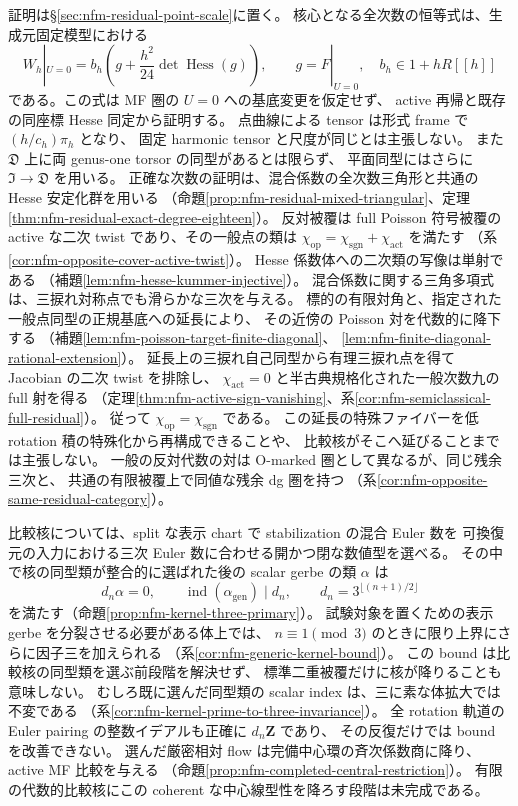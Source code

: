 証明は\S\ref{sec:nfm-residual-point-scale}に置く。
核心となる全次数の恒等式は、生成元固定模型における
\[
 W_h|_{U=0}=b_h\left(g+\frac{h^2}{24}\det\operatorname{Hess}(g)\right),
 \qquad g=F|_{U=0},\quad b_h\in1+hR[[h]]
\]
である。この式は MF 圏の $U=0$ への基底変更を仮定せず、
active 再帰と既存の同座標 Hesse 同定から証明する。
点曲線による tensor は形式 frame で $(h/c_h)\pi_h$ となり、
固定 harmonic tensor と尺度が同じとは主張しない。
また $\mathfrak D$ 上に両 genus-one torsor の同型があるとは限らず、
平面同型にはさらに $\mathfrak I\to\mathfrak D$ を用いる。
正確な次数の証明は、混合係数の全次数三角形と共通の Hesse 安定化群を用いる
（命題\ref{prop:nfm-residual-mixed-triangular}、定理\ref{thm:nfm-residual-exact-degree-eighteen}）。
反対被覆は full Poisson 符号被覆の active な二次 twist であり、その一般点の類は
$\chi_{\mathrm{op}}=\chi_{\mathrm{sgn}}+\chi_{\mathrm{act}}$ を満たす
（系\ref{cor:nfm-opposite-cover-active-twist}）。
Hesse 係数体への二次類の写像は単射である
（補題\ref{lem:nfm-hesse-kummer-injective}）。
混合係数に関する三角多項式は、三捩れ対称点でも滑らかな三次を与える。
標的の有限対角と、指定された一般点同型の正規基底への延長により、
その近傍の Poisson 対を代数的に降下する
（補題\ref{lem:nfm-poisson-target-finite-diagonal}、
\ref{lem:nfm-finite-diagonal-rational-extension}）。
延長上の三捩れ自己同型から有理三捩れ点を得て Jacobian の二次 twist を排除し、
$\chi_{\mathrm{act}}=0$ と半古典規格化された一般次数九の full 射を得る
（定理\ref{thm:nfm-active-sign-vanishing}、系\ref{cor:nfm-semiclassical-full-residual}）。
従って $\chi_{\mathrm{op}}=\chi_{\mathrm{sgn}}$ である。
この延長の特殊ファイバーを低 rotation 積の特殊化から再構成できることや、
比較核がそこへ延びることまでは主張しない。
一般の反対代数の対は O-marked 圏として異なるが、同じ残余三次と、
共通の有限被覆上で同値な残余 dg 圏を持つ
（系\ref{cor:nfm-opposite-same-residual-category}）。

比較核については、split な表示 chart で stabilization の混合 Euler 数を
可換復元の入力における三次 Euler 数に合わせる開かつ閉な数値型を選べる。
その中で核の同型類が整合的に選ばれた後の scalar gerbe の類 $\alpha$ は
\[
 d_n\alpha=0,\qquad
 \operatorname{ind}(\alpha_{\mathrm{gen}})\mid d_n,
 \qquad d_n=3^{\lfloor(n+1)/2\rfloor}
\]
を満たす（命題\ref{prop:nfm-kernel-three-primary}）。
試験対象を置くための表示 gerbe を分裂させる必要がある体上では、
$n\equiv1\pmod3$ のときに限り上界にさらに因子三を加えられる
（系\ref{cor:nfm-generic-kernel-bound}）。
この bound は比較核の同型類を選ぶ前段階を解決せず、
標準二重被覆だけに核が降りることも意味しない。
むしろ既に選んだ同型類の scalar index は、三に素な体拡大では不変である
（系\ref{cor:nfm-kernel-prime-to-three-invariance}）。
全 rotation 軌道の Euler pairing の整数イデアルも正確に $d_n\mathbf Z$ であり、
その反復だけでは bound を改善できない。
選んだ厳密相対 flow は完備中心環の斉次係数商に降り、active MF 比較を与える
（命題\ref{prop:nfm-completed-central-restriction}）。
有限の代数的比較核にこの coherent な中心線型性を降ろす段階は未完成である。

